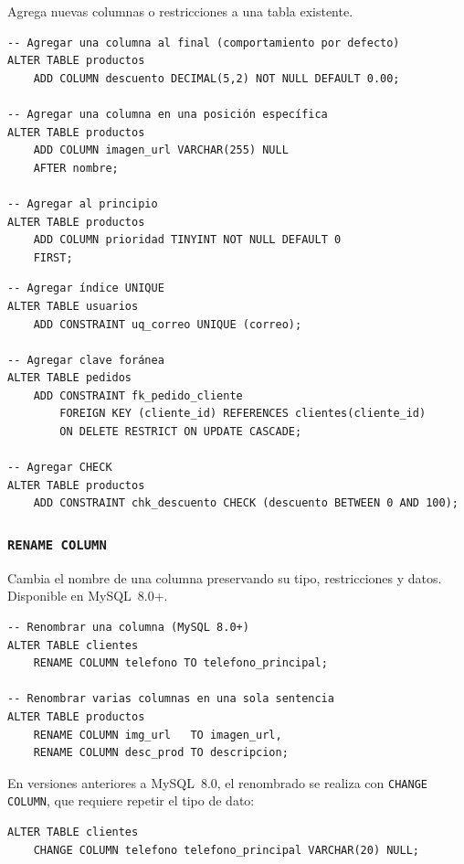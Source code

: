 Agrega nuevas columnas o restricciones a una tabla existente.

\begin{lstlisting}[style=sql, caption={ADD COLUMN — agregar columnas}]
-- Agregar una columna al final (comportamiento por defecto)
ALTER TABLE productos
    ADD COLUMN descuento DECIMAL(5,2) NOT NULL DEFAULT 0.00;

-- Agregar una columna en una posición específica
ALTER TABLE productos
    ADD COLUMN imagen_url VARCHAR(255) NULL
    AFTER nombre;

-- Agregar al principio
ALTER TABLE productos
    ADD COLUMN prioridad TINYINT NOT NULL DEFAULT 0
    FIRST;
\end{lstlisting}

\begin{lstlisting}[style=sql, caption={ADD CONSTRAINT — agregar restricciones}]
-- Agregar índice UNIQUE
ALTER TABLE usuarios
    ADD CONSTRAINT uq_correo UNIQUE (correo);

-- Agregar clave foránea
ALTER TABLE pedidos
    ADD CONSTRAINT fk_pedido_cliente
        FOREIGN KEY (cliente_id) REFERENCES clientes(cliente_id)
        ON DELETE RESTRICT ON UPDATE CASCADE;

-- Agregar CHECK
ALTER TABLE productos
    ADD CONSTRAINT chk_descuento CHECK (descuento BETWEEN 0 AND 100);
\end{lstlisting}

\subsubsection{\texttt{RENAME COLUMN}}

Cambia el nombre de una columna preservando su tipo, restricciones y datos.
Disponible en MySQL~8.0+.

\begin{lstlisting}[style=sql, caption={RENAME COLUMN}]
-- Renombrar una columna (MySQL 8.0+)
ALTER TABLE clientes
    RENAME COLUMN telefono TO telefono_principal;

-- Renombrar varias columnas en una sola sentencia
ALTER TABLE productos
    RENAME COLUMN img_url   TO imagen_url,
    RENAME COLUMN desc_prod TO descripcion;
\end{lstlisting}

\begin{nota}
  En versiones anteriores a MySQL~8.0, el renombrado se realiza con
  \texttt{CHANGE COLUMN}, que requiere repetir el tipo de dato:
\begin{lstlisting}[style=sql, caption={CHANGE COLUMN para MySQL anterior a 8.0}]
ALTER TABLE clientes
    CHANGE COLUMN telefono telefono_principal VARCHAR(20) NULL;
\end{lstlisting}
\end{nota}

